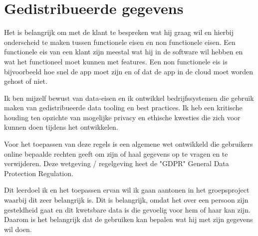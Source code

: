 \newpage
\section{Gedistribueerde gegevens}\label{sec:gedistribueerde-gegevens}

Het is belangrijk om met de klant te bespreken wat hij graag wil en hierbij onderscheid te maken tussen functionele
eisen en non functionele eisen.
Een functionele eis van een klant zijn meestal wat hij in de software wil hebben en wat het functioneel moet kunnen met features.
Een non functionele eis is bijvoorbeeld hoe snel de app moet zijn en of dat de app in de cloud moet worden gehost of
niet.

Ik ben mijzelf bewust van data-eisen en ik ontwikkel bedrijfssystemen die gebruik maken van gedistribueerde
data tooling en best practices.
Ik heb een kritische houding ten opzichte van mogelijke privacy en ethische kwesties die zich voor kunnen doen
tijdens het ontwikkelen.

Voor het toepassen van deze regels is een algemene wet ontwikkeld die gebruikers online bepaalde rechten geeft om zijn of haal gegevens op te vragen en te verwijderen.
Deze wetgeving / regelgeving heet de "GDPR" General Data Protection Regulation.

Dit leerdoel ik en het toepassen ervan wil ik gaan aantonen in het groepsproject waarbij dit zeer belangrijk is.
Dit is belangrijk, omdat het over een persoon zijn gesteldheid gaat en dit kwetsbare data is die gevoelig voor hem of haar kan zijn.
Daarom is het belangrijk dat de gebruiken kan bepalen wat hij met zijn gegevens wil doen.


